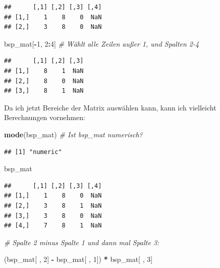 \documentclass[
  ngerman,
]{book}
\newenvironment{Shaded}{\begin{snugshade}}{\end{snugshade}}
\newcommand{\CommentTok}[1]{\textcolor[rgb]{0.56,0.35,0.01}{\textit{#1}}}
\newcommand{\DecValTok}[1]{\textcolor[rgb]{0.00,0.00,0.81}{#1}}
\newcommand{\FunctionTok}[1]{\textcolor[rgb]{0.13,0.29,0.53}{\textbf{#1}}}
\newcommand{\NormalTok}[1]{#1}
\newcommand{\SpecialCharTok}[1]{\textcolor[rgb]{0.81,0.36,0.00}{\textbf{#1}}}
\begin{document}
\begin{verbatim}
##      [,1] [,2] [,3] [,4]
## [1,]    1    8    0  NaN
## [2,]    3    8    0  NaN
\end{verbatim}

\begin{Shaded}
\begin{Highlighting}[]
\NormalTok{bsp\_mat[}\SpecialCharTok{{-}}\DecValTok{1}\NormalTok{, }\DecValTok{2}\SpecialCharTok{:}\DecValTok{4}\NormalTok{]  }\CommentTok{\# Wählt alle Zeilen außer 1, und Spalten 2{-}4}
\end{Highlighting}
\end{Shaded}

\begin{verbatim}
##      [,1] [,2] [,3]
## [1,]    8    1  NaN
## [2,]    8    0  NaN
## [3,]    8    1  NaN
\end{verbatim}

Da ich jetzt Bereiche der Matrix auswählen kann, kann ich vielleicht Berechnungen vornehmen:

\begin{Shaded}
\begin{Highlighting}[]
\FunctionTok{mode}\NormalTok{(bsp\_mat)  }\CommentTok{\# Ist bsp\_mat numerisch?}
\end{Highlighting}
\end{Shaded}

\begin{verbatim}
## [1] "numeric"
\end{verbatim}

\begin{Shaded}
\begin{Highlighting}[]
\NormalTok{bsp\_mat}
\end{Highlighting}
\end{Shaded}

\begin{verbatim}
##      [,1] [,2] [,3] [,4]
## [1,]    1    8    0  NaN
## [2,]    3    8    1  NaN
## [3,]    3    8    0  NaN
## [4,]    7    8    1  NaN
\end{verbatim}

\begin{Shaded}
\begin{Highlighting}[]
\CommentTok{\# Spalte 2 minus Spalte 1 und dann mal Spalte 3:}

\NormalTok{(bsp\_mat[ , }\DecValTok{2}\NormalTok{] }\SpecialCharTok{{-}}\NormalTok{ bsp\_mat[ , }\DecValTok{1}\NormalTok{]) }\SpecialCharTok{*}\NormalTok{ bsp\_mat[ , }\DecValTok{3}\NormalTok{]}
\end{Highlighting}
\end{Shaded}
\end{document}
